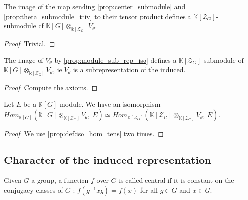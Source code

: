 \begin{proposition}
    \label{prop:center_times_theta_submodule}
    \leanok 
    The image of the map sending \ref{prop:center_submodule} and \ref{prop:theta_submodule_triv}
    to their tensor product defines a $\mathbb{K}[\mathcal{Z}_G]$-submodule of 
    $\mathbb{K}[G]\otimes_{\mathbb{k}[\mathcal{Z}_G]}V_\theta$.
\end{proposition}
\begin{proof}
    \leanok
    Trivial.
\end{proof}

\begin{proposition}
    \label{prop:subsubsub}
    \leanok 
    The image of $V_\theta$ by \ref{prop:module_sub_rep_iso} defines a $\mathbb{K}[\mathcal{Z}_G]$-submodule of 
    $\mathbb{K}[G]\otimes_{\mathbb{k}[\mathcal{Z}_G]}V_\theta$, ie $V_\theta$ is a 
    subrepresentation of the induced.
\end{proposition}
\begin{proof}
    \leanok
    Compute the axioms.
\end{proof}

\begin{proposition}
    \label{prop:induced_property}
    \leanok 
    Let $E$ be a $\mathbb{K}[G]$ module. We have an isomorphism $Hom_{\mathbb{K}[G]}
    \left(\mathbb{K}[G]\otimes_{\mathbb{K}[\mathcal{Z}_G]}V_\theta,\ E\right)\simeq Hom_{\mathbb{K}[\mathcal{Z}_G]}
    \left(\mathbb{K}[\mathcal{Z}_G]\otimes_{\mathbb{K}[\mathcal{Z}_G]}V_\theta,\ E\right)$.
\end{proposition}
\begin{proof}
    \leanok
    We use \ref{prop:def:iso_hom_tens} two times.
\end{proof}

\subsection{Character of the induced representation}

\begin{definition}
    \label{def:central_fun}
    \uses{}
    \leanok 
    Given $G$ a group, a function $f$ over $G$ is called central if it is constant on
    the conjugacy classes of $G$ : $f(g^{-1}xg)=f(x)$ for all $g\in G$ and $x\in G$.
\end{definition}


